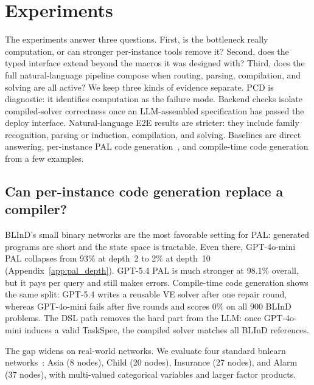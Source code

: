 \documentclass{article}
\newcommand{\taskspec}{TaskSpec}
\begin{document}
\section{Experiments}
\label{sec:experiments}

The experiments answer three questions.
First, is the bottleneck really computation, or can stronger per-instance tools remove it?
Second, does the typed interface extend beyond the macros it was designed with?
Third, does the full natural-language pipeline compose when routing, parsing, compilation, and solving are all active?
We keep three kinds of evidence separate.
PCD is diagnostic: it identifies computation as the failure mode.
Backend checks isolate compiled-solver correctness once an LLM-assembled specification has passed the deploy interface.
Natural-language E2E results are stricter: they include family recognition, parsing or induction, compilation, and solving.
Baselines are direct answering, per-instance PAL code generation~\citep{gao2023pal}, and compile-time code generation from a few examples.

\subsection{Can per-instance code generation replace a compiler?}

BLInD's small binary networks are the most favorable setting for PAL: generated programs are short and the state space is tractable.
Even there, GPT-4o-mini PAL collapses from 93\% at depth~2 to 2\% at depth~10 (Appendix~\ref{app:pal_depth}).
GPT-5.4 PAL is much stronger at 98.1\% overall, but it pays per query and still makes errors.
Compile-time code generation shows the same split: GPT-5.4 writes a reusable VE solver after one repair round, whereas GPT-4o-mini fails after five rounds and scores 0\% on all 900 BLInD problems.
The DSL path removes the hard part from the LLM: once GPT-4o-mini induces a valid \taskspec{}, the compiled solver matches all BLInD references.

The gap widens on real-world networks.
We evaluate four standard bnlearn networks~\citep{scutari2010bnlearn}: Asia (8 nodes), Child (20 nodes), Insurance (27 nodes), and Alarm (37 nodes), with multi-valued categorical variables and larger factor products.
\end{document}
